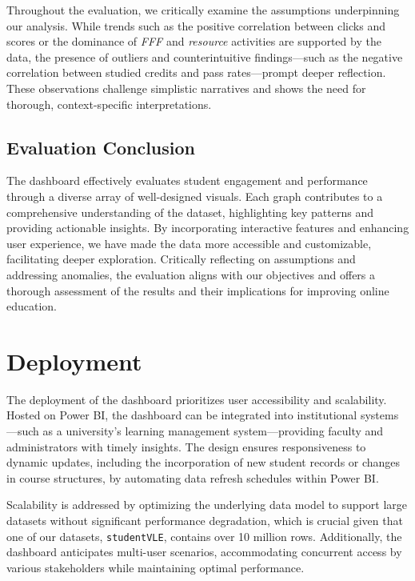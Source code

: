 Throughout the evaluation, we critically examine the assumptions underpinning our analysis. While trends such as the positive correlation between clicks and scores or the dominance of \textit{FFF} and \textit{resource} activities are supported by the data, the presence of outliers and counterintuitive findings—such as the negative correlation between studied credits and pass rates—prompt deeper reflection. These observations challenge simplistic narratives and shows the need for thorough, context-specific interpretations.

\subsection*{Evaluation Conclusion}

The dashboard effectively evaluates student engagement and performance through a diverse array of well-designed visuals. Each graph contributes to a comprehensive understanding of the dataset, highlighting key patterns and providing actionable insights. By incorporating interactive features and enhancing user experience, we have made the data more accessible and customizable, facilitating deeper exploration. Critically reflecting on assumptions and addressing anomalies, the evaluation aligns with our objectives and offers a thorough assessment of the results and their implications for improving online education.

\section{Deployment}

The deployment of the dashboard prioritizes user accessibility and scalability. Hosted on Power BI, the dashboard can be integrated into institutional systems—such as a university's learning management system—providing faculty and administrators with timely insights. The design ensures responsiveness to dynamic updates, including the incorporation of new student records or changes in course structures, by automating data refresh schedules within Power BI.

Scalability is addressed by optimizing the underlying data model to support large datasets without significant performance degradation, which is crucial given that one of our datasets, \texttt{studentVLE}, contains over 10 million rows. Additionally, the dashboard anticipates multi-user scenarios, accommodating concurrent access by various stakeholders while maintaining optimal performance.

